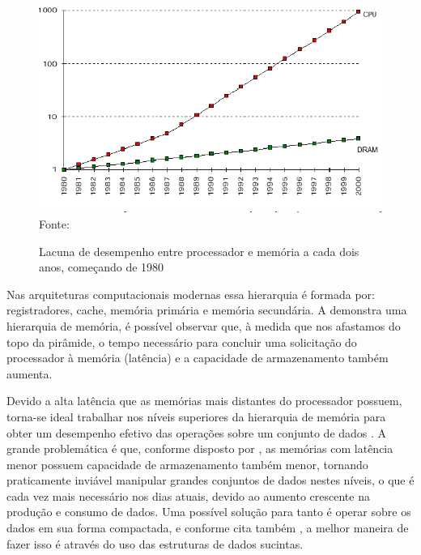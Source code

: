 \begin{figure}[h!]
    \centering
      \caption[Lacuna de desempenho entre processador e memória a cada dois anos, começando de 1980]{Lacuna de desempenho entre processador e memória a cada dois anos, começando de 1980}
      \includegraphics[scale=0.7]{images/gap-processor-memory.png}\\
      \footnotesize{Fonte: \cite{paper-gap-between-processor-memory}}
      \label{fig:processor-memory-performance-gap}
\end{figure} 

Nas arquiteturas computacionais modernas essa hierarquia é formada por: registradores, cache, memória primária e memória secundária. A   demonstra uma hierarquia de memória, é possível observar que, à medida que nos afastamos do topo da pirâmide, o tempo necessário para concluir uma solicitação do processador à memória (latência) e a capacidade de armazenamento também aumenta.

Devido  a alta latência que as memórias mais distantes do processador possuem, torna-se ideal trabalhar nos níveis superiores da hierarquia de memória para obter um desempenho efetivo das operações sobre um conjunto de dados  \citep{book-compact-data-structures}. A grande problemática é que, conforme disposto por \cite{paper-gap-between-processor-memory}, as memórias com latência menor possuem capacidade de armazenamento também menor, tornando praticamente inviável manipular grandes conjuntos de dados nestes níveis, o que é cada vez mais necessário nos dias atuais, devido ao aumento crescente na produção e consumo de dados. Uma possível solução para tanto é operar sobre os dados em sua forma compactada, e conforme cita também \cite{coira-feranando}, a melhor maneira de fazer isso é através do uso das estruturas de dados sucintas.

